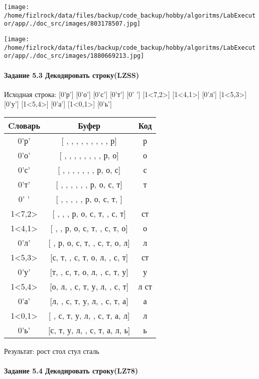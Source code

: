 \documentclass[a4paper, 12pt]{article}
\begin{document}
\texttt{[image: /home/fizlrock/data/files/backup/code\_backup/hobby/algoritms/LabExecutor/app/./doc\_src/images/803178507.jpg]}

\texttt{[image: /home/fizlrock/data/files/backup/code\_backup/hobby/algoritms/LabExecutor/app/./doc\_src/images/1880669213.jpg]}
\pagebreak
\paragraph{Задание 5.3 Декодировать строку(LZSS)\\}

Исходная строка: [0'р'] [0'о'] [0'с'] [0'т'] [0' '] [1<7,2>] [1<4,1>] [0'л'] [1<5,3>] [0'у'] [1<5,4>] [0'а'] [1<0,1>] [0'ь']\\
\begin{table}[h!]
\centering
\begin{tabular}{|c|c|c|}
\hline
 Cловарь & Буфер & Код  \\ \hline
0'р' & [ ,  ,  ,  ,  ,  ,  ,  ,  , р] & р
\\ \hline
0'о' & [ ,  ,  ,  ,  ,  ,  ,  , р, о] & о
\\ \hline
0'с' & [ ,  ,  ,  ,  ,  ,  , р, о, с] & с
\\ \hline
0'т' & [ ,  ,  ,  ,  ,  , р, о, с, т] & т
\\ \hline
0' ' & [ ,  ,  ,  ,  , р, о, с, т,  ] &  
\\ \hline
1<7,2> & [ ,  ,  , р, о, с, т,  , с, т] & ст
\\ \hline
1<4,1> & [ ,  , р, о, с, т,  , с, т, о] & о
\\ \hline
0'л' & [ , р, о, с, т,  , с, т, о, л] & л
\\ \hline
1<5,3> & [с, т,  , с, т, о, л,  , с, т] &  ст
\\ \hline
0'у' & [т,  , с, т, о, л,  , с, т, у] & у
\\ \hline
1<5,4> & [о, л,  , с, т, у, л,  , с, т] & л ст
\\ \hline
0'а' & [л,  , с, т, у, л,  , с, т, а] & а
\\ \hline
1<0,1> & [ , с, т, у, л,  , с, т, а, л] & л
\\ \hline
0'ь' & [с, т, у, л,  , с, т, а, л, ь] & ь
\\ \hline
\end{tabular}
\end{table}

Результат: рост стол стул сталь
\pagebreak
\paragraph{Задание 5.4 Декодировать строку(LZ78)\\}
\end{document}

